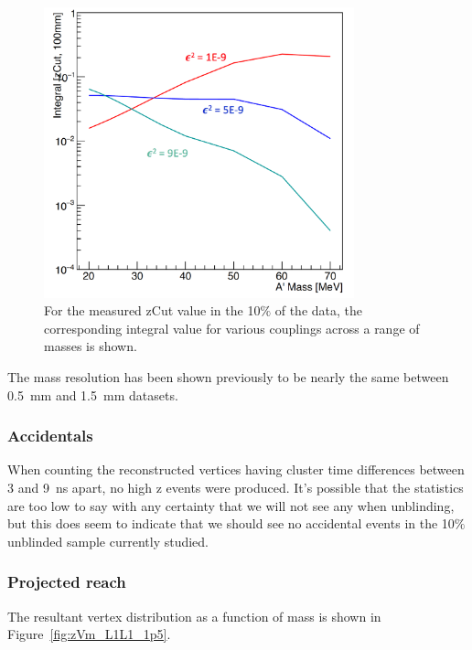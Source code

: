 \begin{figure}[H]
  \centering
     \includegraphics[width=0.8\textwidth]{plots/integratedEff_1p5.png}
  \caption{For the measured zCut value in the 10$\%$ of the data, the corresponding integral value for various couplings across a range of masses is shown.}
  \label{fig:IntCoup_L1l1}
\end{figure} 

The mass resolution has been shown previously to be nearly the same between 0.5~mm and 1.5~mm datasets. 

\subsubsection{Accidentals}

When counting the reconstructed vertices having cluster time differences between 3 and 9~ns apart, no high z events were produced. It's possible that the statistics are too low to say with any certainty that we will not see any when unblinding, but this does seem to indicate that we should see no accidental events in the 10$\%$ unblinded sample currently studied.

\subsubsection{Projected reach}

The resultant vertex distribution as a function of mass is shown in Figure~\ref{fig:zVm_L1L1_1p5}. 

